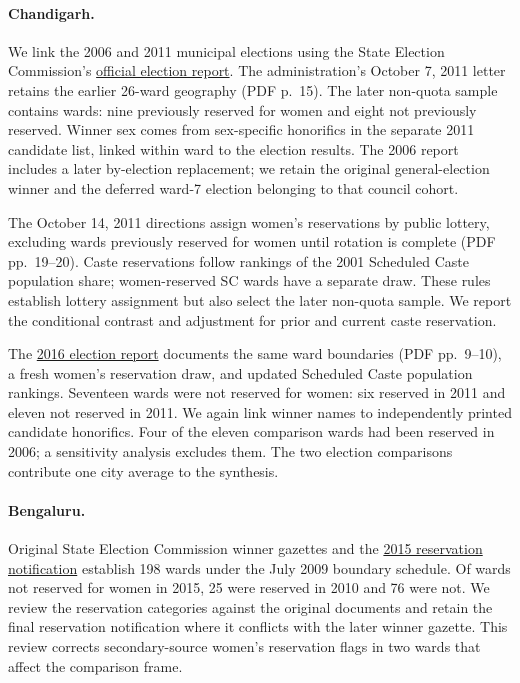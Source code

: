 \paragraph{Chandigarh.} We link the 2006 and 2011 municipal elections using the State Election Commission's \href{https://chandigarh.gov.in/files/documents/election-report-2011.pdf}{official election report}. The administration's October 7, 2011 letter retains the earlier 26-ward geography (PDF p.~15). The later non-quota sample contains \appChandigarhN{} wards: nine previously reserved for women and eight not previously reserved. Winner sex comes from sex-specific honorifics in the separate 2011 candidate list, linked within ward to the election results. The 2006 report includes a later by-election replacement; we retain the original general-election winner and the deferred ward-7 election belonging to that council cohort.

The October 14, 2011 directions assign women's reservations by public lottery, excluding wards previously reserved for women until rotation is complete (PDF pp.~19--20). Caste reservations follow rankings of the 2001 Scheduled Caste population share; women-reserved SC wards have a separate draw. These rules establish lottery assignment but also select the later non-quota sample. We report the conditional contrast and adjustment for prior and current caste reservation.

The \href{https://chandigarh.gov.in/files/GEMCC-2021/election-report-2016.pdf}{2016 election report} documents the same ward boundaries (PDF pp.~9--10), a fresh women's reservation draw, and updated Scheduled Caste population rankings. Seventeen wards were not reserved for women: six reserved in 2011 and eleven not reserved in 2011. We again link winner names to independently printed candidate honorifics. Four of the eleven comparison wards had been reserved in 2006; a sensitivity analysis excludes them. The two election comparisons contribute one city average to the synthesis.

\paragraph{Bengaluru.} Original State Election Commission winner gazettes and the \href{https://web.archive.org/web/20150824072502id_/http://karsec.gov.in/BBMP-2015/reservation.pdf}{2015 reservation notification} establish 198 wards under the July 2009 boundary schedule. Of \appBengaluruEligible{} wards not reserved for women in 2015, 25 were reserved in 2010 and 76 were not. We review the reservation categories against the original documents and retain the final reservation notification where it conflicts with the later winner gazette. This review corrects secondary-source women's reservation flags in two wards that affect the comparison frame.

